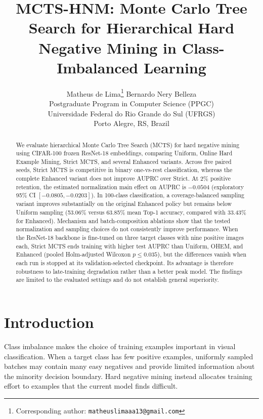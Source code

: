 \documentclass[11pt]{article}
\title{MCTS-HNM: Monte Carlo Tree Search for Hierarchical Hard Negative Mining in Class-Imbalanced Learning}
\author{
  Matheus de Lima\thanks{Corresponding author: \texttt{matheuslimaaa13@gmail.com}} \quad Bernardo Nery Belleza \\
  Postgraduate Program in Computer Science (PPGC) \\
  Universidade Federal do Rio Grande do Sul (UFRGS) \\
  Porto Alegre, RS, Brazil
}
\begin{document}
\maketitle

\begin{abstract}
We evaluate hierarchical Monte Carlo Tree Search (MCTS) for hard negative
mining using CIFAR-100 frozen ResNet-18 embeddings, comparing Uniform,
Online Hard Example Mining, Strict MCTS, and several Enhanced variants.
Across five paired seeds, Strict MCTS is competitive in binary one-vs-rest
classification, whereas the complete Enhanced variant does not improve
AUPRC over Strict. At 2\% positive retention, the estimated normalization
main effect on AUPRC is $-0.0504$ (exploratory 95\% CI $[-0.0805, -0.0203]$). In 100-class classification, a coverage-balanced
sampling variant improves substantially on the original Enhanced policy
but remains below Uniform sampling (53.06\% versus 63.85\% mean Top-1
accuracy, compared with 33.43\% for Enhanced). Mechanism and batch-composition
ablations show that the tested normalization and sampling choices do not
consistently improve performance. When the ResNet-18 backbone is fine-tuned
on three target classes with nine positive images each, Strict MCTS ends
training with higher test AUPRC than Uniform, OHEM, and Enhanced (pooled
Holm-adjusted Wilcoxon $p \le 0.035$), but the differences vanish when each
run is stopped at its validation-selected checkpoint. Its advantage is
therefore robustness to late-training degradation rather than a better
peak model. The findings are limited to the evaluated settings and do not
establish general superiority.

\end{abstract}


\section{Introduction}
\label{sec:intro}

Class imbalance makes the choice of training examples important in visual classification. When a target class has few positive examples, uniformly sampled batches may contain many easy negatives and provide limited information about the minority decision boundary. Hard negative mining instead allocates training effort to examples that the current model finds difficult.
\end{document}
